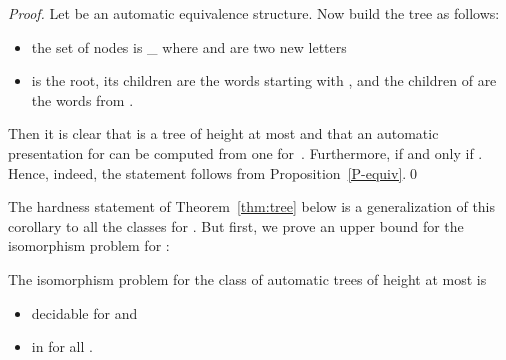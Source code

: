 \documentclass[envcountsame]{llncs}
\begin{document}
\begin{proof}
  Let  be an automatic equivalence structure.
  Now build the tree  as follows:
  \begin{itemize}
  \item the set of nodes is \leq_{} where  and
     are two new letters
  \item  is the root, its children are the words starting with ,
    and the children of  are the words from .
  \end{itemize}
  Then it is clear that  is a tree of height at most  and
  that an automatic presentation for  can be computed from one
  for~. Furthermore,  if and only if . Hence, indeed, the statement follows from
  Proposition~\ref{P-equiv}.\qed
\end{proof}
The hardness statement of Theorem~\ref{thm:tree} below is a
generalization of this corollary to all the classes  for
. But first, we prove an upper bound for the isomorphism
problem for :

\begin{proposition}
\label{prop:tree_membership}
  The isomorphism problem for the class  of automatic trees of
  height at most  is
  \begin{itemize}
  \item decidable for  and
  \item in  for all .
  \end{itemize}
\end{proposition}
\end{document}

